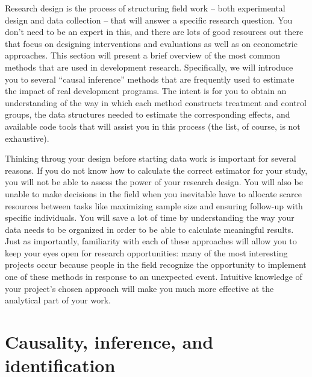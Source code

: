 
\begin{fullwidth}
Research design is the process of structuring field work
-- both experimental design and data collection --
that will answer a specific research question.
You don't need to be an expert in this,
and there are lots of good resources out there
that focus on designing interventions and evaluations
as well as on econometric approaches.
This section will present a brief overview
of the most common methods that are used in development research.
Specifically, we will introduce you to several ``causal inference'' methods
that are frequently used to estimate the impact of real development programs.
The intent is for you to obtain an understanding of
the way in which each method constructs treatment and control groups,
the data structures needed to estimate the corresponding effects,
and available code tools that will assist you in this process (the list, of course, is not exhaustive).

Thinking throug your design before starting data work is important for several reasons.
If you do not know how to calculate the correct estimator for your study,
you will not be able to assess the power of your research design.
You will also be unable to make decisions in the field
when you inevitable have to allocate scarce resources
between tasks like maximizing sample size
and ensuring follow-up with specific individuals.
You will save a lot of time by understanding the way
your data needs to be organized
in order to be able to calculate meaningful results.
Just as importantly, familiarity with each of these approaches
will allow you to keep your eyes open for research opportunities:
many of the most interesting projects occur because people in the field
recognize the opportunity to implement one of these methods
in response to an unexpected event.
Intuitive knowledge of your project's chosen approach will make you
much more effective at the analytical part of your work.
\end{fullwidth}


\section{Causality, inference, and identification}

